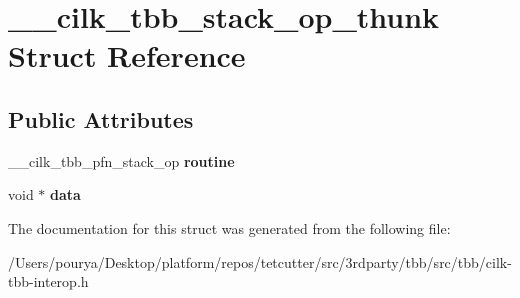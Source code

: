 \hypertarget{struct____cilk__tbb__stack__op__thunk}{}\section{\+\_\+\+\_\+cilk\+\_\+tbb\+\_\+stack\+\_\+op\+\_\+thunk Struct Reference}
\label{struct____cilk__tbb__stack__op__thunk}
\subsection*{Public Attributes}
\begin{DoxyCompactItemize}
\item 
\hypertarget{struct____cilk__tbb__stack__op__thunk_a3e84ab2e5f4c1712af04ee1c70f72f96}{}\+\_\+\+\_\+cilk\+\_\+tbb\+\_\+pfn\+\_\+stack\+\_\+op {\bfseries routine}\label{struct____cilk__tbb__stack__op__thunk_a3e84ab2e5f4c1712af04ee1c70f72f96}

\item 
\hypertarget{struct____cilk__tbb__stack__op__thunk_a674f007efdd2f466a7b8f533930dd590}{}void $\ast$ {\bfseries data}\label{struct____cilk__tbb__stack__op__thunk_a674f007efdd2f466a7b8f533930dd590}

\end{DoxyCompactItemize}


The documentation for this struct was generated from the following file\+:\begin{DoxyCompactItemize}
\item 
/\+Users/pourya/\+Desktop/platform/repos/tetcutter/src/3rdparty/tbb/src/tbb/cilk-\/tbb-\/interop.\+h\end{DoxyCompactItemize}

